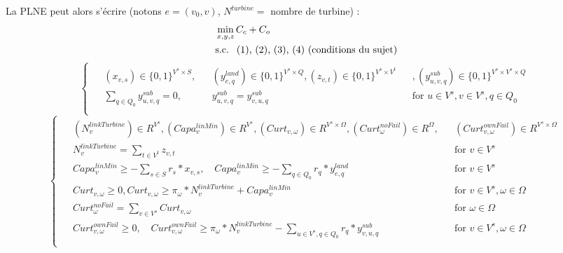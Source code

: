 \documentclass[a4paper,12pt]{article}
\begin{document}
    La PLNE peut alors s'écrire (notons $e = (v_{0},v)$, $N^{turbine} =$ nombre de turbine) :
    \begin{align*}
        & \min_{x,y,z} C_{c}+C_{o} \\
        & \text{s.c. \text{ (1), (2), (3), (4)  (conditions du sujet)}} 
    \end{align*}
    \begin{equation}
        \begin{cases}
            \begin{alignedat}{3}
                & (x_{v,s}) \in \{0,1\}^{V^{s} \times S}, && (y_{e,q}^{land}) \in \{0,1\}^{V^{s} \times Q}, (z_{v,t})\in \{0,1\}^{V^{s} \times V^{t}}&&, (y_{u,v,q}^{sub}) \in \{0,1\}^{V^{s} \times V^{s} \times Q}\\
                & \sum_{q \in Q_0} y_{u,v,q}^{sub} = 0, && y_{u,v,q}^{sub} =  y_{v,u,q}^{sub}  && \text{for } u \in V^s, v \in V^s, q \in Q_0 \\
            \end{alignedat}
        \end{cases}
    \end{equation}
    \begin{equation}
        \begin{cases}
            \begin{alignedat}{2}
                & (N_v^{linkTurbine}) \in R^{V^s}, (Capa_v^{linMin}) \in R^{V^s}, (Curt_{v,\omega}) \in R^{V^s \times \Omega},(Curt_\omega^{noFail}) \in R^{\Omega},&& (Curt_{v, \omega}^{ownFail}) \in R^{V^s \times \Omega} \\
                & N_v^{linkTurbine} = \sum_{t \in V^t} z_{v,t} && \text{for } v \in V^s \\
                & Capa_v^{linMin} \geq - \sum_{s \in S} r_s * x_{v,s}, \quad Capa_v^{linMin} \geq - \sum_{q \in Q_0} r_q * y_{e,q}^{land}  &&  \text{for } v \in V^s  \\
                & Curt_{v,\omega} \geq 0, Curt_{v,\omega} \geq \pi_\omega * N_v^{linkTurbine} + Capa_v^{linMin}  &&  \text{for } v \in V^s, \omega \in \Omega  \\
                & Curt_\omega^{noFail} = \sum_{v \in V^s} Curt_{v,\omega} && \text{for } \omega \in \Omega \\
                & Curt_{v, \omega}^{ownFail} \geq 0, \quad Curt_{v, \omega}^{ownFail} \geq \pi_\omega * N_v^{linkTurbine} - \sum_{u \in V^s, q \in Q_0} r_q * y_{v,u,q}^{sub}  &&  \text{for } v \in V^s, \omega \in \Omega \\
            \end{alignedat}
        \end{cases}
    \end{equation}
\end{document}
